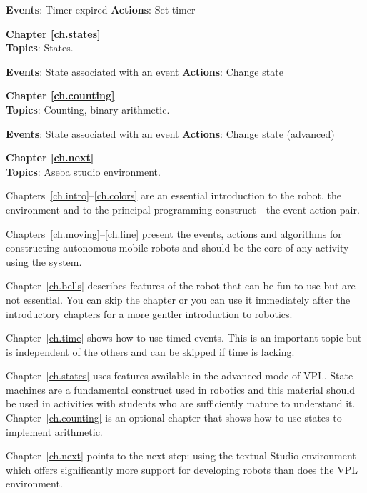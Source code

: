 \textbf{Events}: Timer expired \hfill \textbf{Actions}: Set timer

 \hfill {}

\bigskip

{\centering \textbf{Chapter \ref{ch.states}}\\}
\textbf{Topics}: States.

\textbf{Events}: State associated with an event \hfill \textbf{Actions}: Change state

 \hfill {}

\bigskip

{\centering \textbf{Chapter \ref{ch.counting}}\\}
\textbf{Topics}: Counting, binary arithmetic.

\textbf{Events}: State associated with an event  \hfill \textbf{Actions}: Change state (advanced)

 \hfill {}

\bigskip

{\centering \textbf{Chapter \ref{ch.next}}\\}
\textbf{Topics}: Aseba studio environment.

\bigskip



Chapters~\ref{ch.intro}--\ref{ch.colors} are an essential introduction
to the robot, the environment and to the principal programming construct---the
event-action pair.

Chapters~\ref{ch.moving}--\ref{ch.line} present the events, actions and algorithms
for constructing autonomous mobile robots and should be the core of any
activity using the system.

Chapter~\ref{ch.bells} describes features of the robot that can
be fun to use but are not essential. You can skip the chapter or you can 
use it immediately after the introductory chapters
for a more gentler introduction to robotics.

Chapter~\ref{ch.time} shows how to use timed events.
This is an important topic but is independent of the others
and can be skipped if time is lacking.

Chapter~\ref{ch.states} uses features available in the advanced mode of VPL.
State machines are a fundamental construct used in robotics and this material
should be used in activities with students who are sufficiently mature to understand it. Chapter~\ref{ch.counting} is an optional chapter that shows
how to use states to implement arithmetic.

Chapter~\ref{ch.next} points to the next step: using
the textual Studio environment which offers significantly more support for
developing robots than does the VPL environment.
